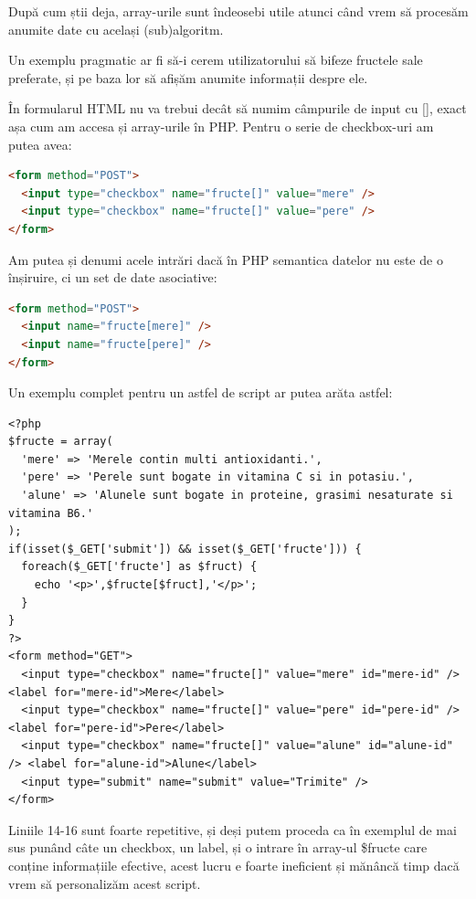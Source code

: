 După cum știi deja, array-urile sunt îndeosebi utile atunci când vrem să procesăm anumite date
cu același (sub)algoritm.

Un exemplu pragmatic ar fi să-i cerem utilizatorului să bifeze fructele sale preferate,
și pe baza lor să afișăm anumite informații despre ele.

În formularul HTML nu va trebui decât să numim câmpurile de input cu {\glqq}[]{\grqq}, exact așa cum
am accesa și array-urile în PHP. Pentru o serie de checkbox-uri am putea avea:
\begin{lstlisting}[language=HTML]
<form method="POST">
  <input type="checkbox" name="fructe[]" value="mere" />
  <input type="checkbox" name="fructe[]" value="pere" />
</form>
\end{lstlisting}
Am putea și denumi acele intrări dacă în PHP semantica datelor nu este
de o înșiruire, ci un set de date asociative:
\begin{lstlisting}[language=HTML]
<form method="POST">
  <input name="fructe[mere]" />
  <input name="fructe[pere]" />
</form>
\end{lstlisting}

Un exemplu complet pentru un astfel de script ar putea arăta astfel:
\begin{lstlisting}[label=lst:favourite-fruits,caption={Fructe favorite}]
<?php
$fructe = array(
  'mere' => 'Merele contin multi antioxidanti.',
  'pere' => 'Perele sunt bogate in vitamina C si in potasiu.',
  'alune' => 'Alunele sunt bogate in proteine, grasimi nesaturate si vitamina B6.'
);
if(isset($_GET['submit']) && isset($_GET['fructe'])) {
  foreach($_GET['fructe'] as $fruct) {
	echo '<p>',$fructe[$fruct],'</p>';
  }
}
?>
<form method="GET">
  <input type="checkbox" name="fructe[]" value="mere" id="mere-id" /> <label for="mere-id">Mere</label>
  <input type="checkbox" name="fructe[]" value="pere" id="pere-id" /> <label for="pere-id">Pere</label>
  <input type="checkbox" name="fructe[]" value="alune" id="alune-id" /> <label for="alune-id">Alune</label>
  <input type="submit" name="submit" value="Trimite" />
</form>
\end{lstlisting}

Liniile 14-16 sunt foarte repetitive, și deși putem proceda ca în exemplul de mai sus punând câte un
checkbox, un label, și o intrare în array-ul \$fructe care conține informațiile efective, acest lucru e foarte
ineficient și mănâncă timp dacă vrem să personalizăm acest script.



